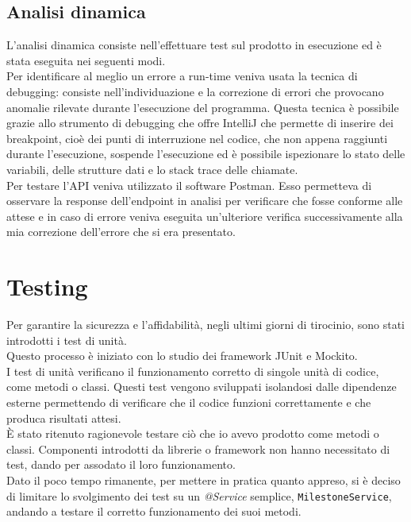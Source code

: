 \subsection{Analisi dinamica}
L'analisi dinamica consiste nell'effettuare test sul prodotto in esecuzione ed è stata eseguita nei seguenti modi.\\
Per identificare al meglio un errore a run-time veniva usata la tecnica di debugging: consiste nell'individuazione e la correzione di errori che provocano anomalie rilevate durante l'esecuzione del programma. Questa tecnica è possibile grazie allo strumento di debugging che offre IntelliJ che permette di inserire dei breakpoint, cioè dei punti di interruzione nel codice, che non appena raggiunti durante l'esecuzione, sospende l'esecuzione ed è possibile ispezionare lo stato delle variabili, delle strutture dati e lo stack trace delle chiamate.\\ 
Per testare l'API veniva utilizzato il software Postman. Esso permetteva di osservare la response dell'endpoint in analisi per verificare che fosse conforme alle attese e in caso di errore veniva eseguita un’ulteriore verifica successivamente alla mia correzione dell’errore che si era presentato.\\

\section{Testing}
Per garantire la sicurezza e l’affidabilità, negli ultimi giorni di tirocinio, sono stati introdotti i test di unità.\\
Questo processo è iniziato con lo studio dei framework JUnit e Mockito.\\
I test di unità verificano il funzionamento corretto di singole unità di codice, come metodi o classi. Questi test vengono sviluppati isolandosi dalle dipendenze esterne permettendo di verificare che il codice funzioni correttamente e che produca risultati attesi.\\
È stato ritenuto ragionevole testare ciò che io avevo prodotto come metodi o classi. Componenti introdotti da librerie o framework non hanno necessitato di test, dando per assodato il loro funzionamento.\\
Dato il poco tempo rimanente, per mettere in pratica quanto appreso, si è deciso di limitare lo svolgimento dei test su un \textit{@Service} semplice, \texttt{MilestoneService}, andando a testare il corretto funzionamento dei suoi metodi.


